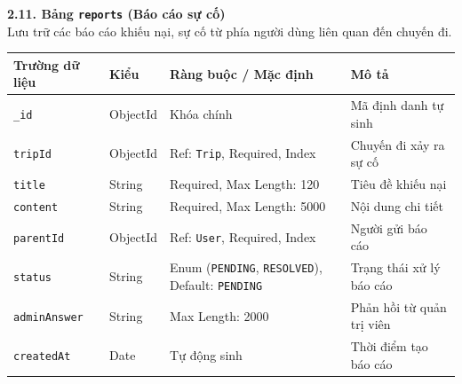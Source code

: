 \documentclass[../DoAn.tex]{subfiles}
\begin{document}
\newpage
\textbf{2.11. Bảng \texttt{reports} (Báo cáo sự cố)} \\
Lưu trữ các báo cáo khiếu nại, sự cố từ phía người dùng liên quan đến chuyến đi.
\begin{table}[H]
    \centering
    \begin{tabular}{|l|l|p{4cm}|p{5cm}|}
        \hline
        \textbf{Trường dữ liệu} & \textbf{Kiểu} & \textbf{Ràng buộc / Mặc định}                                         & \textbf{Mô tả}            \\ \hline
        \texttt{\_id}           & ObjectId      & Khóa chính                                                            & Mã định danh tự sinh      \\ \hline
        \texttt{tripId}         & ObjectId      & Ref: \texttt{Trip}, Required, Index                                   & Chuyến đi xảy ra sự cố    \\ \hline
        \texttt{title}          & String        & Required, Max Length: 120                                             & Tiêu đề khiếu nại         \\ \hline
        \texttt{content}        & String        & Required, Max Length: 5000                                            & Nội dung chi tiết         \\ \hline
        \texttt{parentId}       & ObjectId      & Ref: \texttt{User}, Required, Index                                   & Người gửi báo cáo         \\ \hline
        \texttt{status}         & String        & Enum (\texttt{PENDING}, \texttt{RESOLVED}), Default: \texttt{PENDING} & Trạng thái xử lý báo cáo  \\ \hline
        \texttt{adminAnswer}    & String        & Max Length: 2000                                                      & Phản hồi từ quản trị viên \\ \hline
        \texttt{createdAt}      & Date          & Tự động sinh                                                          & Thời điểm tạo báo cáo     \\ \hline
    \end{tabular}
\end{table}
\end{document}
